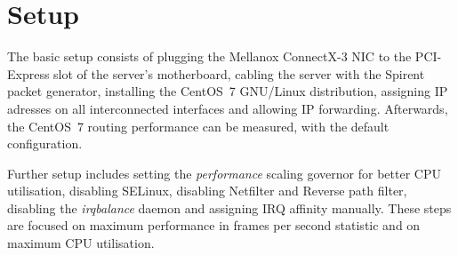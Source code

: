 
\chapter{Setup}\label{chap:setup}
The basic setup consists of plugging the Mellanox ConnectX-3 NIC to the PCI-Express slot of the server's motherboard,
cabling the server with the Spirent packet generator,
installing the CentOS~7 GNU/Linux distribution, assigning IP adresses on all interconnected interfaces
and allowing IP forwarding.
Afterwards, the CentOS~7 routing performance can be measured, with the default configuration.

Further setup includes setting the {\it{performance}} scaling governor for better CPU utilisation,
disabling SELinux, disabling Netfilter and Reverse path filter,
disabling the {\it{irqbalance}} daemon and assigning IRQ affinity manually.
These steps are focused on maximum performance in frames per second statistic
and on maximum CPU utilisation.








